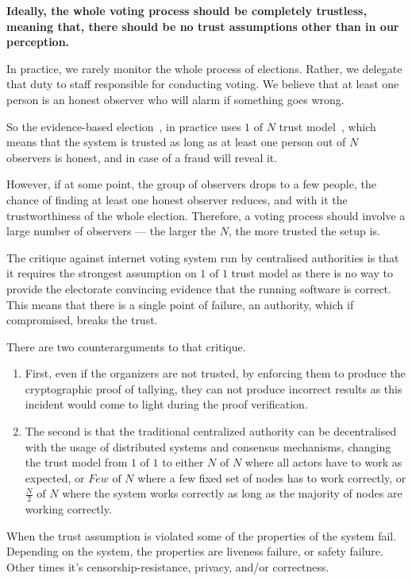 \documentclass[runningheads]{llncs}
\begin{document}
\textbf{Ideally, the whole voting process should be completely trustless, meaning that, there should be no trust assumptions other than in our perception.}

In practice, we rarely monitor the whole process of elections. Rather, we delegate that duty to staff responsible for conducting voting. We believe that at least one person is an honest observer who will alarm if something goes wrong.

So the evidence-based election~\cite{appelEvidenceBasedElectionsCreate2019}, in practice uses $1 \textrm{ of } N$ trust model~\cite{buterinTrustModels2020}, which means that the system is trusted as long as at least one person out of $N$ observers is honest, and in case of a fraud will reveal it.

However, if at some point, the group of observers drops to a few people, the chance of finding at least one honest observer reduces, and with it the trustworthiness of the whole election. Therefore, a voting process should involve a large number of observers — the larger the $N$, the more trusted the setup is.

The critique against internet voting system run by centralised authorities is that it requires the strongest assumption on $1\textrm{ of }1$ trust model as there is no way to provide the electorate convincing evidence that the running software is correct. This means that there is a single point of failure, an authority, which if compromised, breaks the trust.

There are two counterarguments to that critique. 
\begin{enumerate}
    \item First, even if the organizers are not trusted, by enforcing them to produce the cryptographic proof of tallying, they can not produce incorrect results as this incident would come to light during the proof verification.
    \item  The second is that the traditional centralized authority can be decentralised with the usage of distributed systems and consensus mechanisms, changing the trust model from $1 \textrm{ of } 1$ to either $N \textrm{ of } N$ where all actors have to work as expected, or $Few \textrm{ of } N$ where a few fixed set of nodes has to work correctly, or $\frac{N}{2} \textrm{ of } N$ where the system works correctly as long as the majority of nodes are working correctly. 
\end{enumerate}

When the trust assumption is violated some of the properties of the system fail. Depending on the system, the properties are liveness failure, or safety failure. Other times it's censorship-resistance, privacy, and/or correctness.
\end{document}
